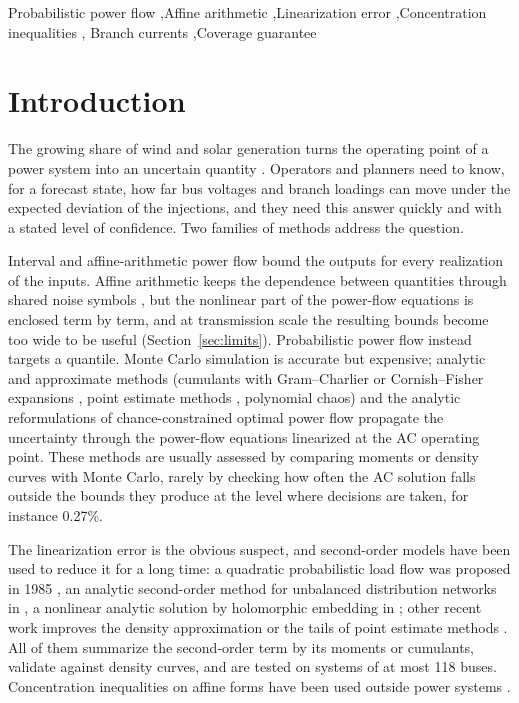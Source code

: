 \documentclass[preprint,12pt]{elsarticle}
\newcommand{\nota}[1]{\textcolor{red}{[NOTA: #1]}}
\begin{document}
\begin{frontmatter}
\begin{keyword}
Probabilistic power flow \sep Affine arithmetic \sep Linearization error \sep Concentration inequalities \sep
Branch currents \sep Coverage guarantee
\end{keyword}
\end{frontmatter}


\section{Introduction}\label{sec:intro}

The growing share of wind and solar generation turns the operating point of a power system into an uncertain
quantity \cite{prusty2017critical}. Operators and planners need to know, for a forecast state, how far bus voltages
and branch loadings can move under the expected deviation of the injections, and they need this answer quickly and
with a stated level of confidence. Two families of methods address the question.

Interval and affine-arithmetic power flow \cite{vaccaro2010AA,dimitrovski2004slack} bound the outputs for every
realization of the inputs. Affine arithmetic keeps the dependence between quantities through shared noise symbols
\cite{defigueiredo2004affine,comba1993affine}, but the nonlinear part of the power-flow equations is enclosed term by
term, and at transmission scale the resulting bounds become too wide to be useful (Section~\ref{sec:limits}).
Probabilistic power flow instead targets a quantile. Monte Carlo simulation is accurate but expensive; analytic and
approximate methods (cumulants with Gram--Charlier or Cornish--Fisher expansions \cite{zhang2004cumulant}, point
estimate methods \cite{hong1998pem}, polynomial chaos) and the analytic reformulations of chance-constrained optimal
power flow \cite{roald2018ccacopf,lubin2019chance} propagate the uncertainty through the power-flow equations
linearized at the AC operating point. These methods are usually assessed by comparing moments or density curves with
Monte Carlo, rarely by checking how often the AC solution falls outside the bounds they produce at the level where
decisions are taken, for instance 0.27\%.

The linearization error is the obvious suspect, and second-order models have been used to reduce it for a long time:
a quadratic probabilistic load flow was proposed in 1985 \cite{brucoli1985quadratic}, an analytic second-order method
for unbalanced distribution networks in \cite{sandoval2022second}, a nonlinear analytic solution by holomorphic
embedding in \cite{liu2018holomorphic}; other recent work improves the density approximation
\cite{basirat2026soeae} or the tails of point estimate methods \cite{singh2025pem}. All of them summarize the
second-order term by its moments or cumulants, validate against density curves, and are tested on systems of at most
118 buses. Concentration inequalities on affine forms have been used outside power
systems \cite{bouissou2016affine}.
\end{document}
